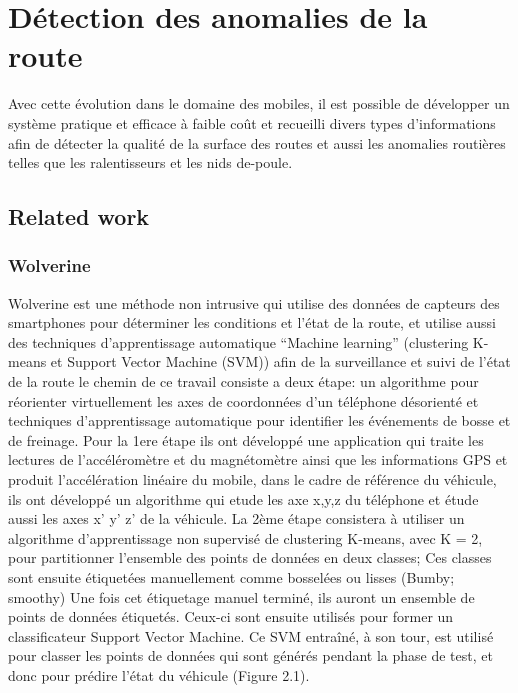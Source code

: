 
\chapter{Détection des anomalies de la route}

Avec cette évolution dans le domaine des mobiles, il est possible de développer un système pratique et efficace à faible coût et
 recueilli divers types d'informations afin de détecter la qualité de la surface des routes et aussi les anomalies routières telles
  que les ralentisseurs et les nids de-poule.

\section{Related work}

\subsection{Wolverine}
Wolverine est \cite{bhoraskarWolverineTrafficRoad2012}une méthode non intrusive qui utilise  des données de capteurs des smartphones pour déterminer les conditions et l'état de la route, et utilise aussi des techniques d'apprentissage automatique “Machine learning” (clustering K-means et Support Vector Machine (SVM)) afin de la surveillance et suivi de l'état de la route
le chemin de ce travail consiste a deux étape: un algorithme pour réorienter virtuellement les axes de coordonnées d'un téléphone désorienté  et techniques d'apprentissage automatique pour identifier les événements de bosse et de freinage.\newline
Pour la 1ere étape ils ont développé une application qui traite les lectures de l'accéléromètre et du magnétomètre ainsi que les informations GPS et produit l'accélération linéaire du mobile, dans le cadre de référence du véhicule, ils ont développé un algorithme qui etude les axe x,y,z du téléphone et étude aussi les axes x’ y’ z’ de la véhicule.\newline
 La 2ème étape consistera à utiliser un algorithme d'apprentissage non supervisé de clustering K-means, avec K = 2, pour partitionner l'ensemble des points de données en deux classes; Ces classes sont ensuite étiquetées manuellement comme bosselées ou lisses (Bumby; smoothy)\newline
Une fois cet étiquetage manuel terminé, ils auront  un ensemble de points de données étiquetés. Ceux-ci sont ensuite utilisés pour former un classificateur Support Vector Machine. Ce SVM entraîné, à son tour, est utilisé pour classer les points de données qui sont générés pendant la phase de test, et donc pour prédire l'état du véhicule (Figure 2.1). \newline
